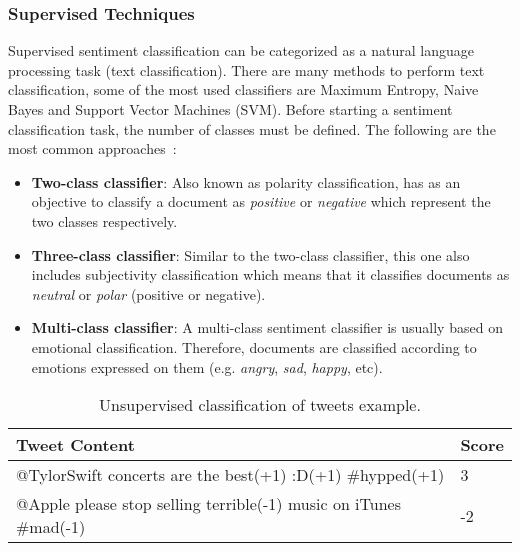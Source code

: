 { \subsubsection{Supervised Techniques}
 
 Supervised sentiment classification can be categorized as a natural language processing task (text classification). There are many methods to perform text classification, some of the most used classifiers are Maximum Entropy, Naive Bayes and Support Vector Machines (SVM). Before starting a sentiment classification task, the number of classes must be defined. The following are the most common approaches~\cite{liu2012sentiment}:
 
 \begin{itemize}
  \item \textbf{Two-class classifier}: Also known as polarity classification, has as an objective to classify a document as \textit{positive} or \textit{negative} which represent the two classes respectively.
  
  \item \textbf{Three-class classifier}: Similar to the two-class classifier, this one also includes subjectivity classification which means that it classifies documents as \textit{neutral} or \textit{polar} (positive or negative).
  
  \item \textbf{Multi-class classifier}: A multi-class sentiment classifier is usually based on emotional classification. Therefore, documents are classified according to emotions expressed on them (e.g. \textit{angry}, \textit{sad}, \textit{happy}, etc). 
  
\end{itemize}

\begin{table}[]
\centering
\caption{Unsupervised classification of tweets example.}
\label{tab:unsupervised_example}
\begin{tabular}{l|l}
\textbf{Tweet Content}                                                           & \textbf{Score} \\ \hline
{\color[HTML]{000000} @TylorSwift concerts are the best{\color[HTML]{036400}(+1)} :D{\color[HTML]{036400}(+1)} \#hypped{\color[HTML]{036400}(+1)}} & {\color[HTML]{036400} 3} \\ \hline
@Apple please stop selling terrible{\color[HTML]{CB0000}(-1)} music on iTunes \#mad{\color[HTML]{CB0000}(-1)}                & {\color[HTML]{CB0000}-2}                       \\ \hline
\end{tabular}
\end{table}

}
